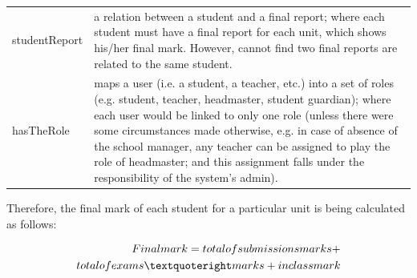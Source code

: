 \begin{table}[bth]
\begin{tabular}{p{0.9 in} p{5.9 in}}
studentReport &  a relation between a student and a final report; where each student must have a final report for each unit, which shows his/her final mark.  However, cannot find two final reports are related to the same student.\\

hasTheRole & maps a user (i.e. a student, a teacher, etc.) into a set of roles (e.g. student, teacher, headmaster, student guardian); where each user would be linked to only one role (unless there were some circumstances made otherwise, e.g. in case of absence of the school manager, any teacher can be assigned to play the role of headmaster; and this assignment falls under the responsibility of the system’s admin).

\\ \hline\hline
\end{tabular}
\label{tab:namehere}
\end{table}

Therefore, the final mark of each student for a particular unit is being calculated as follows:

\begin{align*}
Final mark = total of submissions marks + \\ total of exams’ marks + in\-class mark
\end{align*}






